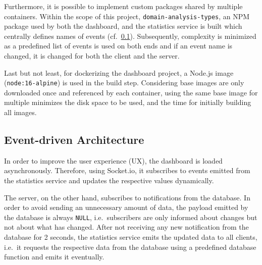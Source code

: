 Furthermore, it is possible to implement custom packages shared by multiple containers.
Within the scope of this project, \texttt{domain-analysis-types}, an NPM package used by both the dashboard, and the statistics service is built which centrally defines names of events (cf.~\ref{subsec:event-driven-architecture}).
Subsequently, complexity is minimized as a predefined list of events is used on both ends and if an event name is changed, it is changed for both the client and the server.

Last but not least, for dockerizing the dashboard project, a Node.js image (\texttt{node:16-alpine}) is used in the build step.
Considering base images are only downloaded once and referenced by each container, using the same base image for multiple minimizes the disk space to be used, and the time for initially building all images.~\autocite[cf.][pp. 8-9]{Arundel.2019}

\subsection{Event-driven Architecture}\label{subsec:event-driven-architecture}

In order to improve the user experience (UX), the dashboard is loaded asynchronously.
Therefore, using Socket.io, it subscribes to events emitted from the statistics service and updates the respective values dynamically.

The server, on the other hand, subscribes to notifications from the database.
In order to avoid sending an unnecessary amount of data, the payload emitted by the database is always \texttt{NULL}, i.e.\ subscribers are only informed about changes but not about what has changed.
After not receiving any new notification from the database for 2 seconds, the statistics service emits the updated data to all clients, i.e.\ it requests the respective data from the database using a predefined database function and emits it eventually.
